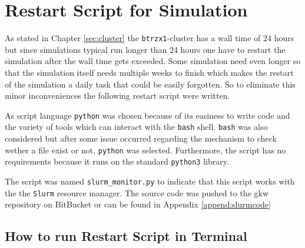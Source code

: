 \section{Restart Script for Simulation}
\label{sec:restartscript}

As stated in Chapter \ref{sec:cluster} the \texttt{btrzx1}-cluster has a wall time of 24 hours but since simulations typical run longer than 24 hours one have to restart the simulation after the wall time gets exceeded. Some simulation need even longer so that the simulation itself needs multiple weeks to finish which makes the restart of the simulation a daily task that could be easily forgotten. So to eliminate this minor inconveniences the following restart script were written.

As script language \texttt{python} was chosen because of its easiness to write code and the variety of tools which can interact with the \texttt{bash} shell. \texttt{bash} was also considered but after some issue occurred regarding the mechanism to check wether a file exist or not, \texttt{python} was selected. Furthermore, the script has no requirements because it runs on the standard \texttt{python3} library.

The script was named \texttt{slurm\_monitor.py} to indicate that this script works with the the \texttt{Slurm} resource manager. The source code was pushed to the gkw repository on BitBucket \cite{slurmmonitor} or can be found in Appendix \ref{append:slurmcode}

\subsection{How to run Restart Script in Terminal}
\label{sub:codeRun}

